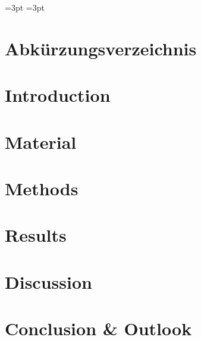\documentclass[english, version-2019-07]{uzl-thesis}
\begin{document}
=3pt
=3pt



\chapter*{Abkürzungsverzeichnis}



\chapter{Introduction}



\chapter{Material}



\chapter{Methods}



\chapter{Results}



\chapter{Discussion}



\chapter{Conclusion \& Outlook}



\begin{bibtex-entries}



\end{bibtex-entries}
\end{document}
